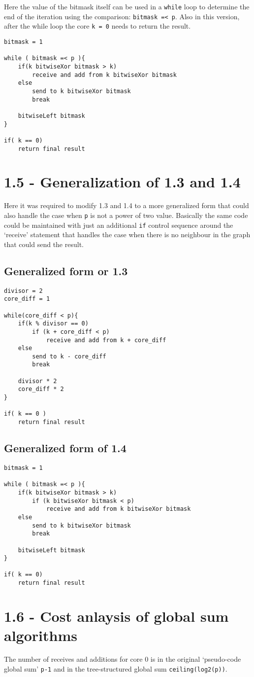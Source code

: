 \documentclass[a4paper,11pt,twoside]{article}
\begin{document}
Here the value of the bitmask itself can be used in a \verb+while+ loop to determine the end of the iteration using the comparison: \verb+bitmask =< p+. Also in this version, after the while loop the core \verb+k = 0+ needs to return the result.

\begin{verbatim}
bitmask = 1

while ( bitmask =< p ){
    if(k bitwiseXor bitmask > k)
        receive and add from k bitwiseXor bitmask
    else
        send to k bitwiseXor bitmask
        break

    bitwiseLeft bitmask
}

if( k == 0)
    return final result

\end{verbatim}



\section{1.5 - Generalization of 1.3 and 1.4}
Here it was required to modify 1.3 and 1.4 to a more generalized form that could also handle the case when \verb+p+ is not a power of two value.
Basically the same code could be maintained with just an additional \verb+if+ control sequence around the `receive' statement that handles the case when there is no neighbour in the graph that could send the result. 


\subsection{Generalized form or 1.3}
\begin{verbatim}
divisor = 2
core_diff = 1

while(core_diff < p){
    if(k % divisor == 0)
        if (k + core_diff < p)  
            receive and add from k + core_diff
    else 
        send to k - core_diff
        break

    divisor * 2
    core_diff * 2
}

if( k == 0 )
    return final result
\end{verbatim}

\subsection{Generalized form of 1.4} 
\begin{verbatim}
bitmask = 1

while ( bitmask =< p ){
    if(k bitwiseXor bitmask > k)
        if (k bitwiseXor bitmask < p)
            receive and add from k bitwiseXor bitmask
    else
        send to k bitwiseXor bitmask
        break

    bitwiseLeft bitmask
}

if( k == 0)
    return final result
\end{verbatim}

\section{1.6 - Cost anlaysis of global sum algorithms}
The number of receives and additions for core 0 is in the original `pseudo-code global sum' \verb+p-1+ and in the tree-structured global sum \verb+ceiling(log2(p))+.


\end{document}
